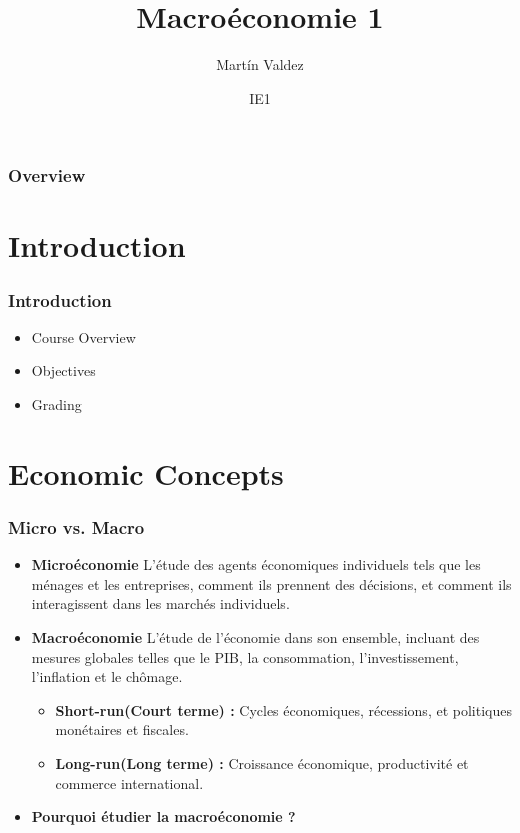 \documentclass{beamer}
\title{Macroéconomie 1}
\author{Mart\'in Valdez}
\date{IE1}
\begin{document}
\begin{frame}
\titlepage
\end{frame}

\begin{frame}
\frametitle{Overview}
\tableofcontents
\end{frame}

\section{Introduction}
\begin{frame}
\frametitle{Introduction}
\begin{itemize}
    \item Course Overview
    \item Objectives
    \item Grading
\end{itemize}
\end{frame}

\section{Economic Concepts}
\begin{frame}
\frametitle{Micro vs. Macro}
\begin{itemize}
    \item \textbf{Microéconomie}
    L'étude des agents économiques individuels tels que les ménages et les entreprises,
    comment ils prennent des décisions, et comment ils interagissent dans les marchés individuels.
    \pause
    \item \textbf{Macroéconomie}
    L'étude de l'économie dans son ensemble, incluant des mesures globales telles que
    le PIB, la consommation, l'investissement, l'inflation et le chômage.
    \begin{itemize}
        \item \textbf{Short-run(Court terme) :} Cycles économiques, récessions, et politiques monétaires et fiscales.\pause
        \item \textbf{Long-run(Long terme) :} Croissance économique, productivité et commerce international.
    \end{itemize}
    \item \textbf{Pourquoi étudier la macroéconomie ?}
\end{itemize}
\end{frame}
\end{document}
